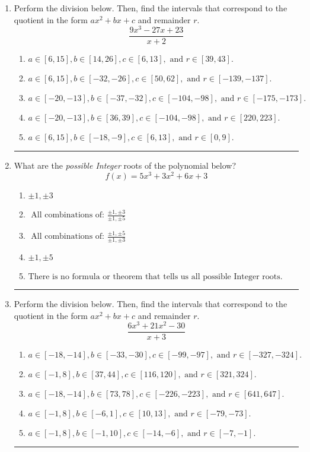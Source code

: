 \documentclass[14pt]{extbook}
\newcommand{\litem}[1]{\item#1\hspace*{-1cm}\rule{\textwidth}{0.4pt}}
\begin{document}
\begin{enumerate}
\litem{
Perform the division below. Then, find the intervals that correspond to the quotient in the form $ax^2+bx+c$ and remainder $r$.\[ \frac{9x^{3} -27 x + 23}{x + 2} \]\begin{enumerate}[label=\Alph*.]
\item \( a \in [6, 15], b \in [14, 26], c \in [6, 13], \text{ and } r \in [39, 43]. \)
\item \( a \in [6, 15], b \in [-32, -26], c \in [50, 62], \text{ and } r \in [-139, -137]. \)
\item \( a \in [-20, -13], b \in [-37, -32], c \in [-104, -98], \text{ and } r \in [-175, -173]. \)
\item \( a \in [-20, -13], b \in [36, 39], c \in [-104, -98], \text{ and } r \in [220, 223]. \)
\item \( a \in [6, 15], b \in [-18, -9], c \in [6, 13], \text{ and } r \in [0, 9]. \)

\end{enumerate} }
\litem{
What are the \textit{possible Integer} roots of the polynomial below?\[ f(x) = 5x^{3} +3 x^{2} +6 x + 3 \]\begin{enumerate}[label=\Alph*.]
\item \( \pm 1,\pm 3 \)
\item \( \text{ All combinations of: }\frac{\pm 1,\pm 3}{\pm 1,\pm 5} \)
\item \( \text{ All combinations of: }\frac{\pm 1,\pm 5}{\pm 1,\pm 3} \)
\item \( \pm 1,\pm 5 \)
\item \( \text{There is no formula or theorem that tells us all possible Integer roots.} \)

\end{enumerate} }
\litem{
Perform the division below. Then, find the intervals that correspond to the quotient in the form $ax^2+bx+c$ and remainder $r$.\[ \frac{6x^{3} +21 x^{2} -30}{x + 3} \]\begin{enumerate}[label=\Alph*.]
\item \( a \in [-18, -14], b \in [-33, -30], c \in [-99, -97], \text{ and } r \in [-327, -324]. \)
\item \( a \in [-1, 8], b \in [37, 44], c \in [116, 120], \text{ and } r \in [321, 324]. \)
\item \( a \in [-18, -14], b \in [73, 78], c \in [-226, -223], \text{ and } r \in [641, 647]. \)
\item \( a \in [-1, 8], b \in [-6, 1], c \in [10, 13], \text{ and } r \in [-79, -73]. \)
\item \( a \in [-1, 8], b \in [-1, 10], c \in [-14, -6], \text{ and } r \in [-7, -1]. \)


\end{enumerate}}
\end{enumerate}
\end{document}
